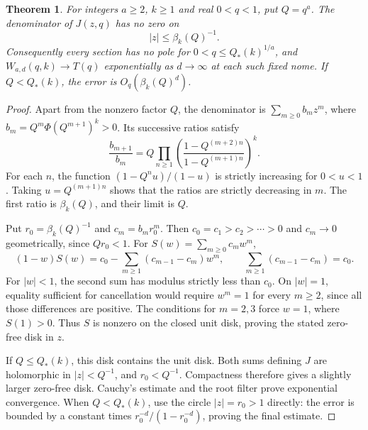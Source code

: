 \documentclass[11pt]{amsart}
\newtheorem{theorem}{Theorem}[section]
\theoremstyle{definition}
\theoremstyle{remark}
\numberwithin{equation}{section}
\begin{document}
\begin{theorem}\label{zerofree}
For integers $a\ge2$, $k\ge1$ and real $0<q<1$, put $Q=q^a$. The denominator of $J(z,q)$ has no zero on
\[
 |z|\le\beta_k(Q)^{-1}.
\]
Consequently every section has no pole for $0<q\le Q_*(k)^{1/a}$, and $W_{a,d}(q,k)\to T(q)$ exponentially as $d\to\infty$ at each such fixed nome. If $Q<Q_*(k)$, the error is $O_q(\beta_k(Q)^d)$.
\end{theorem}
\begin{proof}
Apart from the nonzero factor $Q$, the denominator is $\sum_{m\ge0}b_mz^m$, where $b_m=Q^m\Phi(Q^{m+1})^k>0$. Its successive ratios satisfy
\[
 \frac{b_{m+1}}{b_m}
 =Q\prod_{n\ge1}
 \left(\frac{1-Q^{(m+2)n}}{1-Q^{(m+1)n}}\right)^k.
\]
For each $n$, the function $(1-Q^nu)/(1-u)$ is strictly increasing for $0<u<1$. Taking $u=Q^{(m+1)n}$ shows that the ratios are strictly decreasing in $m$. The first ratio is $\beta_k(Q)$, and their limit is $Q$.

Put $r_0=\beta_k(Q)^{-1}$ and $c_m=b_mr_0^m$. Then $c_0=c_1>c_2>\cdots>0$ and $c_m\to0$ geometrically, since $Qr_0<1$. For $S(w)=\sum_{m\ge0}c_mw^m$,
\[
 (1-w)S(w)=c_0-\sum_{m\ge1}(c_{m-1}-c_m)w^m,
 \qquad \sum_{m\ge1}(c_{m-1}-c_m)=c_0.
\]
For $|w|<1$, the second sum has modulus strictly less than $c_0$. On $|w|=1$, equality sufficient for cancellation would require $w^m=1$ for every $m\ge2$, since all those differences are positive. The conditions for $m=2,3$ force $w=1$, where $S(1)>0$. Thus $S$ is nonzero on the closed unit disk, proving the stated zero-free disk in $z$.

If $Q\le Q_*(k)$, this disk contains the unit disk. Both sums defining $J$ are holomorphic in $|z|<Q^{-1}$, and $r_0<Q^{-1}$. Compactness therefore gives a slightly larger zero-free disk. Cauchy's estimate and the root filter prove exponential convergence. When $Q<Q_*(k)$, use the circle $|z|=r_0>1$ directly: the error is bounded by a constant times $r_0^{-d}/(1-r_0^{-d})$, proving the final estimate.
\end{proof}
\end{document}

